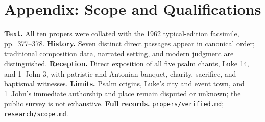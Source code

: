 
\section*{Appendix: Scope and Qualifications}

\begin{studyframe}
\textbf{Text.} All ten propers were collated with the 1962 typical-edition facsimile, pp.~377--378. \textbf{History.} Seven distinct direct passages appear in canonical order; traditional composition data, narrated setting, and modern judgment are distinguished. \textbf{Reception.} Direct exposition of all five psalm chants, Luke 14, and 1~John 3, with patristic and Antonian banquet, charity, sacrifice, and baptismal witnesses. \textbf{Limits.} Psalm origins, Luke's city and event town, and 1~John's immediate authorship and place remain disputed or unknown; the public survey is not exhaustive. \textbf{Full records.} \nolinkurl{propers/verified.md}; \nolinkurl{research/scope.md}.
\end{studyframe}

